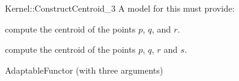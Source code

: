 \begin{ccRefFunctionObjectConcept}{Kernel::ConstructCentroid_3}
A model for this must provide:


 {compute the centroid of the points $p$, $q$, and $r$.}

 {compute the centroid of the points $p$, $q$, $r$ and $s$.}

\ccRefines
AdaptableFunctor (with three arguments)

\ccSeeAlso
{} \\

\end{ccRefFunctionObjectConcept}
